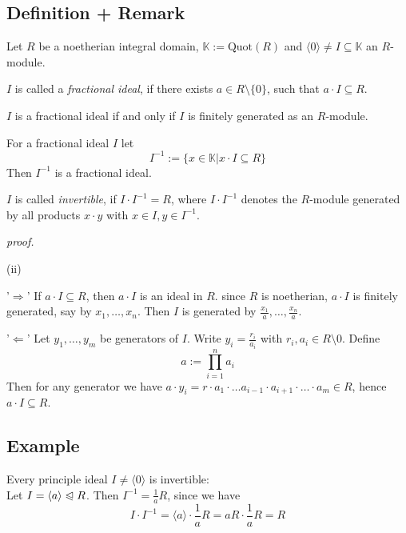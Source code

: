 \documentclass[12pt]{book}
\begin{document}
\begin{spacing}{1.3}
\subsection{Definition + Remark} %
Let $R$ be a noetherian integral domain, $\mathbb{K}:= \textrm{Quot}(R)$ and $\langle 0 \rangle \neq I \subseteq \mathbb{K}$ an $R$-module.
\begin{compactenum}
\item $I$ is called a \textit{fractional ideal}, if there exists $a \in R\setminus \{0\}$, such that $a \cdot I \subseteq R$. 
\item $I$ is a fractional ideal if and only if $I$ is finitely generated as an $R$-module.
\item For a fractional ideal $I$ let
$$I^{-1}:=\{x \in \mathbb{K} \big\vert x \cdot I \subseteq R \}$$
Then $I^{-1}$ is a fractional ideal.
\item $I$ is called \textit{invertible}, if $I \cdot I^{-1}=R$, where $I \cdot I^{-1}$ denotes the $R$-module generated by all products $x\cdot y$ with $x \in I, y \in I^{-1}$.
\end{compactenum}
\textit{proof.}
\begin{compactenum}
\item[(ii)] \begin{compactenum}
\item['$\Rightarrow$'] If $a \cdot I \subseteq R$, then $a \cdot I$ is an ideal in $R$. since $R$ is noetherian, $a \cdot I$ is finitely generated, say by $x_1, \ldots, x_n$. Then $I$ is generated by $\frac{x_1}{a}, \ldots, \frac{x_n}{a}$. 
\item['$\Leftarrow$'] Let $y_1, \ldots, y_m$ be generators of $I$. Write $y_i = \frac{r_i}{a_i}$ with $r_i, a_i \in R\setminus 0$. Define
$$a:= \prod_{i=1}^n a_i$$
Then for any generator we have $a \cdot y_i = r \cdot a_1 \cdot \ldots a_{i-1} \cdot a_{i+1} \cdot  \ldots \cdot a_m \in R$, hence $a \cdot I \subseteq R$.
\end{compactenum} 
\end{compactenum}

\subsection*{Example} %
\titleformat{\subsection}{\normalfont\normalsize\bfseries}{}{0em}{#1 \thesubsection}
Every principle ideal $I \neq \langle 0 \rangle$ is invertible:\\
Let $I=\langle a \rangle \trianglelefteqslant R$. Then $I^{-1}=\frac{1}{a} R$, since we have
$$I \cdot I^{-1}=\langle a \rangle \cdot \frac{1}{a} R=aR \cdot \frac{1}{a}R=R$$


\end{spacing}
\end{document}
